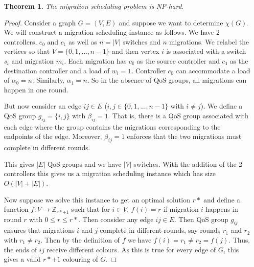 \documentclass[letterpaper,12pt,titlepage,oneside,final]{article}
\newtheorem{theorem}{Theorem}
\begin{document}
\begin{theorem}
    The migration scheduling problem is NP-hard.
\end{theorem}
\begin{proof}
    Consider a graph $G = (V, E)$ and suppose we want to determine $\chi(G)$. We will construct a migration scheduling instance as follows. We have 2 controllers, $c_{0}$ and $c_{1}$ as well as $n = |V|$ switches and $n$ migrations. We relabel the vertices so that $V = \{0, 1, ..., n-1\}$ and then vertex $i$ is associated with a switch $s_{i}$ and migration $m_{i}$. Each migration has $c_{0}$ as the source controller and $c_{1}$ as the destination controller and a load of $w_{i} = 1$. Controller $c_{0}$ can accommodate a load of $\alpha_{0} = n$. Similarly, $\alpha_{1} = n$. So in the absence of QoS groups, all migrations can happen in one round.
    
    But now consider an edge $ij \in E$ ($i, j \in \{0, 1, ..., n - 1\}$ with $i \neq j$). We define a QoS group $g_{ij} = \{i, j\}$ with $\beta_{ij} = 1$. That is, there is a QoS group associated with each edge where the group contains the migrations corresponding to the endpoints of the edge. Moreover, $\beta_{ij} = 1$ enforces that the two migrations must complete in different rounds.
    
    This gives $|E|$ QoS groups and we have $|V|$ switches. With the addition of the 2 controllers this gives us a migration scheduling instance which has size $O(|V| + |E|)$.
    
    Now suppose we solve this instance to get an optimal solution $r*$ and define a function $f: V \rightarrow \mathbb{Z}_{r* + 1}$ such that for $i \in V$, $f(i) = r$ if migration $i$ happens in round $r$ with $0 \leq r \leq r*$. Then consider any edge $ij \in E$. Then QoS group $g_{ij}$ ensures that migrations $i$ and $j$ complete in different rounds, say rounds $r_{1}$ and $r_{2}$ with $r_{1} \neq r_{2}$. Then by the definition of $f$ we have $f(i) = r_{1} \neq r_{2} = f(j)$. Thus, the ends of $ij$ receive different colours. As this is true for every edge of $G$, this gives a valid $r* + 1$ colouring of $G$.
    

\end{proof}
\end{document}
